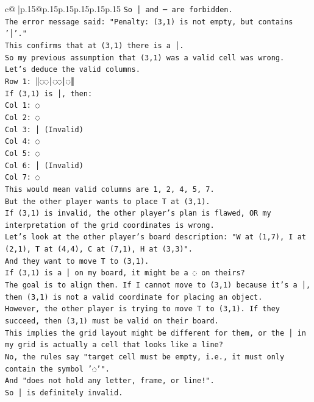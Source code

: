 \documentclass{article}
\begin{document}
{\begin{supertabular}{c@{$\;$}|p{.15\linewidth}@{}p{.15\linewidth}p{.15\linewidth}p{.15\linewidth}p{.15\linewidth}p{.15\linewidth}}
{{{\texttt{So │ and ─ are forbidden.} \\
\texttt{The error message said: "Penalty: (3,1) is not empty, but contains '│'."} \\
\texttt{This confirms that at (3,1) there is a │.} \\
\texttt{So my previous assumption that (3,1) was a valid cell was wrong.} \\
\texttt{Let's deduce the valid columns.} \\
\texttt{Row 1: ║◌◌│◌◌│◌║} \\
\texttt{If (3,1) is │, then:} \\
\texttt{Col 1: ◌} \\
\texttt{Col 2: ◌} \\
\texttt{Col 3: │ (Invalid)} \\
\texttt{Col 4: ◌} \\
\texttt{Col 5: ◌} \\
\texttt{Col 6: │ (Invalid)} \\
\texttt{Col 7: ◌} \\
\texttt{This would mean valid columns are 1, 2, 4, 5, 7.} \\
\texttt{But the other player wants to place T at (3,1).} \\
\texttt{If (3,1) is invalid, the other player's plan is flawed, OR my interpretation of the grid coordinates is wrong.} \\
\texttt{Let's look at the other player's board description: "W at (1,7), I at (2,1), T at (4,4), C at (7,1), H at (3,3)".} \\
\texttt{And they want to move T to (3,1).} \\
\texttt{If (3,1) is a │ on my board, it might be a ◌ on theirs?} \\
\texttt{The goal is to align them. If I cannot move to (3,1) because it's a │, then (3,1) is not a valid coordinate for placing an object.} \\
\texttt{However, the other player is trying to move T to (3,1). If they succeed, then (3,1) must be valid on their board.} \\
\texttt{This implies the grid layout might be different for them, or the │ in my grid is actually a cell that looks like a line?} \\
\texttt{No, the rules say "target cell must be empty, i.e., it must only contain the symbol '◌'".} \\
\texttt{And "does not hold any letter, frame, or line!".} \\
\texttt{So │ is definitely invalid.} \\
}}}
\end{supertabular}}
\end{document}
